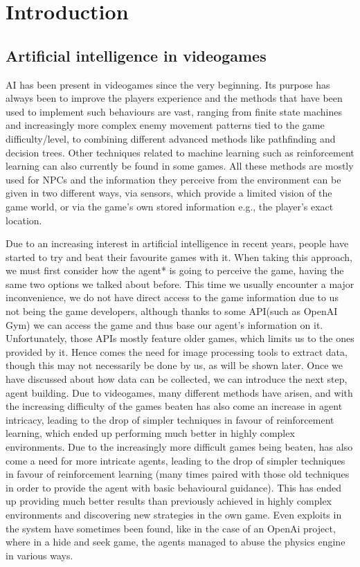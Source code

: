 
\chapter{Introduction}
\section{Artificial intelligence in videogames}

AI has been present in videogames since the very beginning.
Its purpose has always been to improve the players experience and the methods that have been used to implement such behaviours are vast, ranging from finite state machines and increasingly more complex enemy movement patterns tied to the game difficulty/level, to combining different advanced methods like pathfinding and decision trees. Other techniques related to machine learning such as reinforcement learning can also currently be found in some games. All these methods are mostly used for \ac{NPC}s and the information they perceive from the environment can be given in two different ways, via sensors, which provide a limited vision of the game world, or via the game’s own stored information e.g., the player’s exact location.

Due to an increasing interest in artificial intelligence in recent years, people have started to try and beat their favourite games with it. When taking this approach, we must first consider how the agent* is going to perceive the game, having the same two options we talked about before. This time we usually encounter a major inconvenience, we do not have direct access to the game information due to us not being the game developers, although thanks to some \ac{API}(such as OpenAI Gym) we can access the game and thus base our agent’s information on it. Unfortunately, those APIs mostly feature older games, which limits us to the ones provided by it. Hence comes the need for image processing tools to extract data, though this may not necessarily be done by us, as will be shown later.
Once we have discussed about how data can be collected, we can introduce the next step, agent building. Due to videogames, many different methods have arisen, and with the increasing difficulty of the games beaten has also come an increase in agent intricacy, leading to the drop of simpler techniques in favour of reinforcement learning, which ended up performing much better in highly complex environments.
Due to the increasingly more difficult games being beaten, has also come a need for more intricate agents, leading to the drop of simpler techniques in favour of reinforcement learning (many times paired with those old techniques in order to provide the agent with basic behavioural guidance). This has ended up providing much better results than previously achieved in highly complex environments and discovering new strategies in the own game. Even exploits in the system have sometimes been found, like in the case of an OpenAi project, where in a hide and seek game, the agents managed to abuse the physics engine in various ways.

